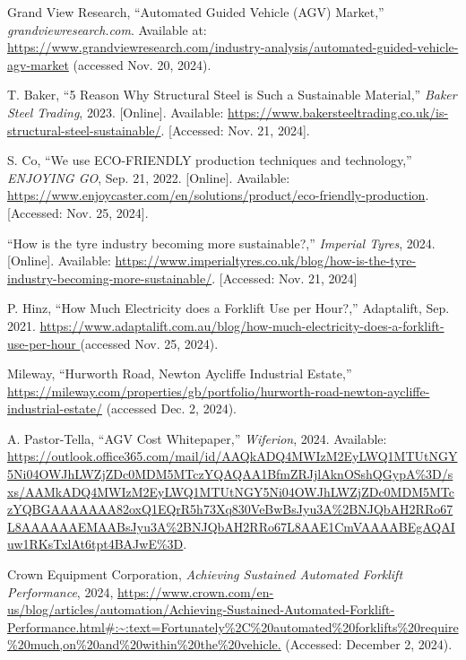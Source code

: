 \documentclass[12pt]{article}
\begin{document}
\begin{thebibliography}{99}
Grand View Research, “Automated Guided Vehicle (AGV) Market,” \textit{grandviewresearch.com}.  
Available at: \url{https://www.grandviewresearch.com/industry-analysis/automated-guided-vehicle-agv-market} (accessed Nov. 20, 2024).

 T. Baker, ``5 Reason Why Structural Steel is Such a Sustainable Material,'' \textit{Baker Steel Trading}, 2023. [Online]. Available: \url{https://www.bakersteeltrading.co.uk/is-structural-steel-sustainable/}. [Accessed: Nov. 21, 2024].

 S. Co, ``We use ECO-FRIENDLY production techniques and technology,'' \textit{ENJOYING GO}, Sep. 21, 2022. [Online]. Available: \url{https://www.enjoycaster.com/en/solutions/product/eco-friendly-production}. [Accessed: Nov. 25, 2024].

``How is the tyre industry becoming more sustainable?,'' \textit{Imperial Tyres}, 2024. [Online]. Available: \url{https://www.imperialtyres.co.uk/blog/how-is-the-tyre-industry-becoming-more-sustainable/}. [Accessed: Nov. 21, 2024]

P. Hinz, “How Much Electricity does a Forklift Use per Hour?,” Adaptalift, Sep. 2021. \url{https://www.adaptalift.com.au/blog/how-much-electricity-does-a-forklift-use-per-hour }(accessed Nov. 25, 2024).

Mileway, “Hurworth Road, Newton Aycliffe Industrial Estate,” \url{https://mileway.com/properties/gb/portfolio/hurworth-road-newton-aycliffe-industrial-estate/} (accessed Dec. 2, 2024).
 
A. Pastor-Tella, ``AGV Cost Whitepaper,'' \textit{Wiferion}, 2024. Available: \url{https://outlook.office365.com/mail/id/AAQkADQ4MWIzM2EyLWQ1MTUtNGY5Ni04OWJhLWZjZDc0MDM5MTczYQAQAA1BfmZRJjlAknOSshQGypA%3D/sxs/AAMkADQ4MWIzM2EyLWQ1MTUtNGY5Ni04OWJhLWZjZDc0MDM5MTczYQBGAAAAAAA82oxQ1EQrR5h73Xq830VeBwBsJyu3A%2BNJQbAH2RRo67L8AAAAAAEMAABsJyu3A%2BNJQbAH2RRo67L8AAE1CmVAAAABEgAQAIuw1RKsTxlAt6tpt4BAJwE%3D}.





Crown Equipment Corporation, \textit{Achieving Sustained Automated Forklift Performance}, 2024, \url{https://www.crown.com/en-us/blog/articles/automation/Achieving-Sustained-Automated-Forklift-Performance.html#:~:text=Fortunately%2C%20automated%20forklifts%20require%20much,on%20and%20within%20the%20vehicle.} (Accessed: December 2, 2024).



 

\end{thebibliography}
 
\end{document}
